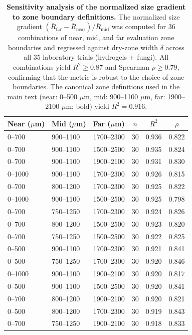 \documentclass[11pt]{article}
\begin{document}
\clearpage


\begin{table}[H]
\centering
\caption{\textbf{Sensitivity analysis of the normalized size gradient to zone boundary definitions.} The normalized size gradient $(\bar{R}_{\mathrm{far}} - \bar{R}_{\mathrm{near}})/\bar{R}_{\mathrm{mid}}$ was computed for 36 combinations of near, mid, and far evaluation zone boundaries and regressed against dry-zone width $\delta$ across all 35 laboratory trials (hydrogels + fungi). All combinations yield $R^2 \geq 0.87$ and Spearman $\rho \geq 0.79$, confirming that the metric is robust to the choice of zone boundaries. The canonical zone definitions used in the main text (near: 0--500 $\mu$m, mid: 900--1100 $\mu$m, far: 1900--2100 $\mu$m; bold) yield $R^2 = 0.916$.}
\label{tab:sensitivity}
\vspace{0.5em}
\small
\begin{tabular}{lllccc}
\toprule
Near ($\mu$m) & Mid ($\mu$m) & Far ($\mu$m) & $n$ & $R^2$ & $\rho$ \\
\midrule
0--700 & 900--1100 & 1700--2300 & 30 & 0.936 & 0.822 \\
0--700 & 900--1100 & 1500--2500 & 30 & 0.935 & 0.824 \\
0--700 & 900--1100 & 1900--2100 & 30 & 0.931 & 0.830 \\
0--1000 & 900--1100 & 1700--2300 & 30 & 0.926 & 0.815 \\
0--700 & 800--1200 & 1700--2300 & 30 & 0.925 & 0.822 \\
0--1000 & 900--1100 & 1500--2500 & 30 & 0.925 & 0.798 \\
0--700 & 750--1250 & 1700--2300 & 30 & 0.924 & 0.826 \\
0--700 & 800--1200 & 1500--2500 & 30 & 0.923 & 0.820 \\
0--700 & 750--1250 & 1500--2500 & 30 & 0.922 & 0.825 \\
0--500 & 900--1100 & 1700--2300 & 30 & 0.921 & 0.841 \\
0--500 & 750--1250 & 1700--2300 & 30 & 0.920 & 0.846 \\
0--1000 & 900--1100 & 1900--2100 & 30 & 0.920 & 0.817 \\
0--500 & 900--1100 & 1500--2500 & 30 & 0.920 & 0.841 \\
0--700 & 800--1200 & 1900--2100 & 30 & 0.920 & 0.821 \\
0--500 & 800--1200 & 1700--2300 & 30 & 0.919 & 0.843 \\
0--700 & 750--1250 & 1900--2100 & 30 & 0.918 & 0.833 \\

\end{tabular}
\end{table}
\end{document}
